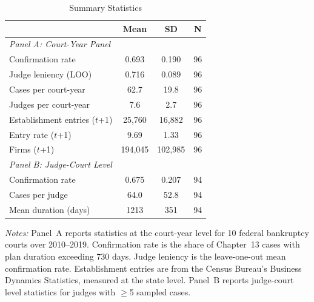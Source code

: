 \begin{table}[htbp]
\centering
\caption{Summary Statistics}
\label{tab:summary}
\begin{threeparttable}
\begin{tabular}{lccc}
\toprule
 & Mean & SD & N \\
\midrule
\multicolumn{4}{l}{\textit{Panel A: Court-Year Panel}} \\[3pt]
Confirmation rate & 0.693 & 0.190 & 96 \\
Judge leniency (LOO) & 0.716 & 0.089 & 96 \\
Cases per court-year & 62.7 & 19.8 & 96 \\
Judges per court-year & 7.6 & 2.7 & 96 \\
Establishment entries ($t$+1) & 25,760 & 16,882 & 96 \\
Entry rate ($t$+1) & 9.69 & 1.33 & 96 \\
Firms ($t$+1) & 194,045 & 102,985 & 96 \\
\midrule
\multicolumn{4}{l}{\textit{Panel B: Judge-Court Level}} \\[3pt]
Confirmation rate & 0.675 & 0.207 & 94 \\
Cases per judge & 64.0 & 52.8 & 94 \\
Mean duration (days) & 1213 & 351 & 94 \\
\bottomrule
\end{tabular}
\begin{tablenotes}
\small
\item \textit{Notes:} Panel~A reports statistics at the court-year level for 10 federal bankruptcy courts over 2010--2019. Confirmation rate is the share of Chapter~13 cases with plan duration exceeding 730 days. Judge leniency is the leave-one-out mean confirmation rate. Establishment entries are from the Census Bureau's Business Dynamics Statistics, measured at the state level. Panel~B reports judge-court level statistics for judges with $\geq$5 sampled cases.
\end{tablenotes}
\end{threeparttable}
\end{table}
